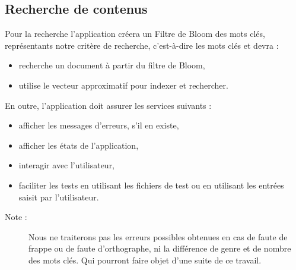 	\subsection{Recherche de contenus}
	Pour la recherche l’application créera un Filtre de Bloom des mots clés, représentants notre critère de recherche, c’est-à-dire les mots clés et devra :
	\begin{itemize}
		\item recherche un document à partir du filtre de Bloom,
 		\item utilise le vecteur approximatif pour indexer et rechercher.
	\end{itemize}
	
En outre, l’application doit assurer les services suivants :

	\begin{itemize}
	\item afficher les messages d'erreurs, s'il en existe,	
	\item afficher les états de l'application,	
	\item interagir avec l'utilisateur,
	\item faciliter les tests en utilisant les fichiers de test ou en utilisant les entrées saisit par l'utilisateur.
	\end{itemize}
	\begin{description}
		\item[Note :] Nous ne traiterons pas les erreurs  possibles obtenues en cas de faute de frappe ou de faute d’orthographe, ni la différence de genre et de nombre des mots clés. Qui pourront faire objet d’une suite de ce travail.
			\end{description}
